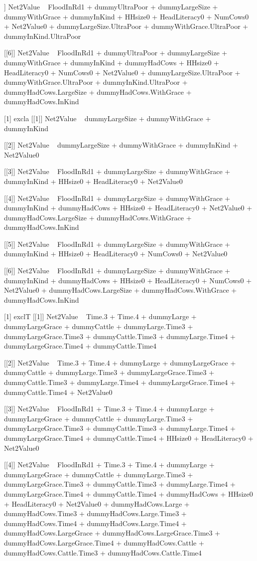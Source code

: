 \begin{Schunk}
\begin{Soutput}
[[5]]
Net2Value ~ FloodInRd1 + dummyUltraPoor + dummyLargeSize + dummyWithGrace + 
    dummyInKind + HHsize0 + HeadLiteracy0 + NumCows0 + Net2Value0 + 
    dummyLargeSize.UltraPoor + dummyWithGrace.UltraPoor + dummyInKind.UltraPoor

[[6]]
Net2Value ~ FloodInRd1 + dummyUltraPoor + dummyLargeSize + dummyWithGrace + 
    dummyInKind + dummyHadCows + HHsize0 + HeadLiteracy0 + NumCows0 + 
    Net2Value0 + dummyLargeSize.UltraPoor + dummyWithGrace.UltraPoor + 
    dummyInKind.UltraPoor + dummyHadCows.LargeSize + dummyHadCows.WithGrace + 
    dummyHadCows.InKind

[1] excla
[[1]]
Net2Value ~ dummyLargeSize + dummyWithGrace + dummyInKind

[[2]]
Net2Value ~ dummyLargeSize + dummyWithGrace + dummyInKind + Net2Value0

[[3]]
Net2Value ~ FloodInRd1 + dummyLargeSize + dummyWithGrace + dummyInKind + 
    HHsize0 + HeadLiteracy0 + Net2Value0

[[4]]
Net2Value ~ FloodInRd1 + dummyLargeSize + dummyWithGrace + dummyInKind + 
    dummyHadCows + HHsize0 + HeadLiteracy0 + Net2Value0 + dummyHadCows.LargeSize + 
    dummyHadCows.WithGrace + dummyHadCows.InKind

[[5]]
Net2Value ~ FloodInRd1 + dummyLargeSize + dummyWithGrace + dummyInKind + 
    HHsize0 + HeadLiteracy0 + NumCows0 + Net2Value0

[[6]]
Net2Value ~ FloodInRd1 + dummyLargeSize + dummyWithGrace + dummyInKind + 
    dummyHadCows + HHsize0 + HeadLiteracy0 + NumCows0 + Net2Value0 + 
    dummyHadCows.LargeSize + dummyHadCows.WithGrace + dummyHadCows.InKind

[1] exclT
[[1]]
Net2Value ~ Time.3 + Time.4 + dummyLarge + dummyLargeGrace + 
    dummyCattle + dummyLarge.Time3 + dummyLargeGrace.Time3 + 
    dummyCattle.Time3 + dummyLarge.Time4 + dummyLargeGrace.Time4 + 
    dummyCattle.Time4

[[2]]
Net2Value ~ Time.3 + Time.4 + dummyLarge + dummyLargeGrace + 
    dummyCattle + dummyLarge.Time3 + dummyLargeGrace.Time3 + 
    dummyCattle.Time3 + dummyLarge.Time4 + dummyLargeGrace.Time4 + 
    dummyCattle.Time4 + Net2Value0

[[3]]
Net2Value ~ FloodInRd1 + Time.3 + Time.4 + dummyLarge + dummyLargeGrace + 
    dummyCattle + dummyLarge.Time3 + dummyLargeGrace.Time3 + 
    dummyCattle.Time3 + dummyLarge.Time4 + dummyLargeGrace.Time4 + 
    dummyCattle.Time4 + HHsize0 + HeadLiteracy0 + Net2Value0

[[4]]
Net2Value ~ FloodInRd1 + Time.3 + Time.4 + dummyLarge + dummyLargeGrace + 
    dummyCattle + dummyLarge.Time3 + dummyLargeGrace.Time3 + 
    dummyCattle.Time3 + dummyLarge.Time4 + dummyLargeGrace.Time4 + 
    dummyCattle.Time4 + dummyHadCows + HHsize0 + HeadLiteracy0 + 
    Net2Value0 + dummyHadCows.Large + dummyHadCows.Time3 + dummyHadCows.Large.Time3 + 
    dummyHadCows.Time4 + dummyHadCows.Large.Time4 + dummyHadCows.LargeGrace + 
    dummyHadCows.LargeGrace.Time3 + dummyHadCows.LargeGrace.Time4 + 
    dummyHadCows.Cattle + dummyHadCows.Cattle.Time3 + dummyHadCows.Cattle.Time4


\end{Soutput}
\end{Schunk}
